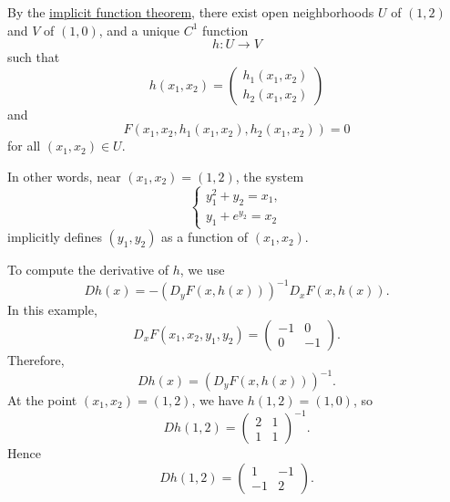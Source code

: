 \begin{example}
		By the \hyperref[thm:implicit-function-theorem]{implicit function theorem}, there exist open neighborhoods $U$ of
		$(1,2)$ and $V$ of $(1,0)$, and a unique $C^1$ function
		\begin{equation}
			h: U \to V
		\end{equation}
		such that
		\begin{equation}
			h(x_1,x_2)
			=
			\begin{pmatrix}
				h_1(x_1,x_2) \\
				h_2(x_1,x_2)
			\end{pmatrix}
		\end{equation}
		and
		\begin{equation}
			F(x_1,x_2,h_1(x_1,x_2),h_2(x_1,x_2))=0
		\end{equation}
		for all $(x_1,x_2)\in U$.

		In other words, near $(x_1,x_2)=(1,2)$, the system
		\begin{equation}
			\begin{cases}
				y_1^2+y_2=x_1, \\
				y_1+e^{y_2}=x_2
			\end{cases}
		\end{equation}
		implicitly defines $(y_1,y_2)$ as a function of $(x_1,x_2)$.

		To compute the derivative of $h$, we use
		\begin{equation}
			Dh(x)
			=
			-\left(D_yF(x,h(x))\right)^{-1}D_xF(x,h(x)).
		\end{equation}
		In this example,
		\begin{equation}
			D_xF(x_1,x_2,y_1,y_2)
			=
			\begin{pmatrix}
				-1 & 0 \\
				0 & -1
			\end{pmatrix}.
		\end{equation}
		Therefore,
		\begin{equation}
			Dh(x)
			=
			\left(D_yF(x,h(x))\right)^{-1}.
		\end{equation}
		At the point $(x_1,x_2)=(1,2)$, we have $h(1,2)=(1,0)$, so
		\begin{equation}
			Dh(1,2)
			=
			\begin{pmatrix}
				2 & 1 \\
				1 & 1
			\end{pmatrix}^{-1}.
		\end{equation}
		Hence
		\begin{equation}
			Dh(1,2)
			=
			\begin{pmatrix}
				1 & -1 \\
				-1 & 2
			\end{pmatrix}.
		\end{equation}
	\end{example}

